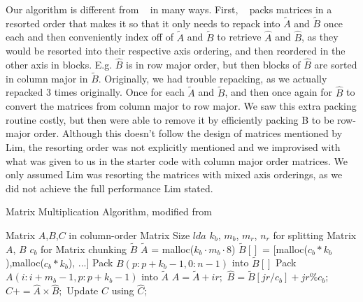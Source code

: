 \documentclass{article}
\begin{document}
Our algorithm is different from ~\cite{10.1007/s10586-018-2810-y} in many ways. First, ~\cite{10.1007/s10586-018-2810-y} packs matrices in a resorted order that makes it so that it only needs to repack into $\tilde{A}$ and $\tilde{B}$ once each and then conveniently index off of $\tilde{A}$ and $\tilde{B}$ to retrieve $\hat{A}$ and $\hat{B}$, as they would be resorted into their respective axis ordering, and then reordered in the other axis in blocks. E.g. $\hat{B}$ is in row major order, but then blocks of $\hat{B}$ are sorted in column major in $\tilde{B}$. Originally, we had trouble repacking, as we actually repacked 3 times originally. Once for each $\tilde{A}$ and $\tilde{B}$, and then once again for $\hat{B}$ to convert the matrices from column major to row major. We saw this extra packing routine costly, but then were able to remove it by efficiently packing B to be row-major order. Although this doesn't follow the design of matrices mentioned by Lim, the resorting order was not explicitly mentioned and we improvised with what was given to us in the starter code with column major order matrices. We only assumed Lim was resorting the matrices with mixed axis orderings, as we did not achieve the full performance Lim stated.

\begin{algorithm}[H]
\label{alg:algorithm1}
\caption{Matrix Multiplication Algorithm, modified from ~\cite{10.1007/s10586-018-2810-y}}
\begin{algorithmic}
    \Require Matrix $A$,$B$,$C$ in  column-order
    \Require Matrix Size $lda$
    \Require $k_b$, $m_b$, $m_r$, $n_r$ for splitting Matrix $A$, $B$ 
    \Require $c_b$ for Matrix chunking $\tilde{B}$
    \State $\tilde{A}$ = malloc($k_b \cdot m_b \cdot 8$)
    \State $\tilde{B}[]$ = [malloc($c_b * k_b$),malloc($c_b * k_b$), ...] 
        \State Pack $B(p : p + k_b - 1, 0: n - 1)$ into $\tilde{B}[]$ 
            \State Pack $A(i : i + m_b - 1, p: p + k_b - 1)$ into $\tilde{A}$ 
                    \State $\hat{A} = \tilde{A} + ir;$
                    \State $\hat{B} = \tilde{B}[jr/c_b] + jr\%c_b;$
                    \State $\hat{C} += \hat{A}\times\hat{B};$ 
                    \State Update $C$ using $\hat{C}$;
                \EndFor    
            \EndFor    
        \EndFor    
    \EndFor
\end{algorithmic}
\end{algorithm}
\end{document}
